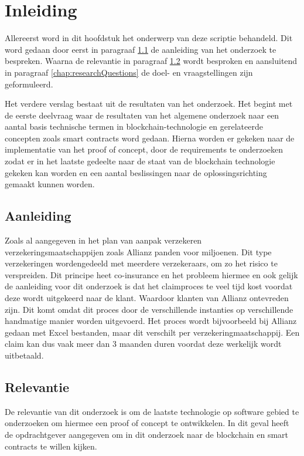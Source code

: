 \chapter{Inleiding}
Allereerst word in dit hoofdstuk het onderwerp van deze scriptie behandeld. Dit word gedaan door eerst in paragraaf \ref{chap:motivation} de aanleiding van het onderzoek te bespreken. Waarna de relevantie in  paragraaf \ref{chap:relevance} wordt besproken en aansluitend in
paragraaf \ref{chap:researchQuestions} de doel- en vraagstellingen zijn geformuleerd.

Het verdere verslag bestaat uit de resultaten van het onderzoek. Het begint met de eerste deelvraag waar de resultaten van het algemene onderzoek naar een aantal basis technische termen in blockchain-technologie en gerelateerde concepten zoals smart contracts word gedaan. Hierna worden er gekeken naar de implementatie van het proof of concept, door de requirements te onderzoeken zodat er in het laatste gedeelte naar de staat van de blockchain technologie gekeken kan worden en een aantal beslissingen naar de oplossingsrichting gemaakt kunnen worden.

\section{Aanleiding}\label{chap:motivation}
Zoals al aangegeven in het plan van aanpak verzekeren verzekeringsmaatschappijen zoals Allianz panden voor miljoenen. Dit type verzekeringen wordengedeeld met meerdere verzekeraars, om zo het risico te verspreiden. Dit principe heet co-insurance en het probleem hiermee en ook gelijk de aanleiding voor dit onderzoek is dat het claimproces te veel tijd kost voordat deze wordt uitgekeerd naar de klant. Waardoor klanten van Allianz ontevreden zijn. Dit komt omdat dit proces door de verschillende instanties op verschillende handmatige manier worden uitgevoerd. Het proces wordt bijvoorbeeld bij Allianz gedaan met Excel bestanden, maar dit verschilt per verzekeringmaatschappij.
Een claim kan dus vaak meer dan 3 maanden duren voordat deze werkelijk wordt uitbetaald.

\section{Relevantie}\label{chap:relevance}
De relevantie van dit onderzoek is om de laatste technologie op software gebied te onderzoeken om hiermee een proof of concept te ontwikkelen. In dit geval heeft de opdrachtgever aangegeven om in dit onderzoek naar de blockchain en smart contracts te willen kijken.

